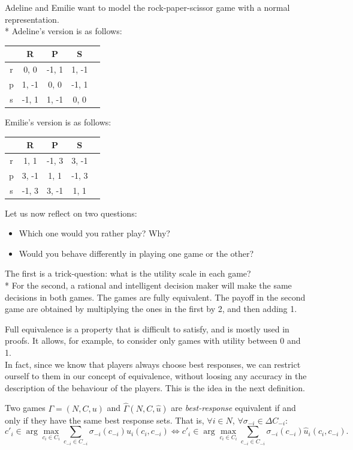 \begin{example}
Adeline and Emilie want to model the rock-paper-scissor game with a normal representation. \\*
Adeline's version is as follows:
\begin{center}
\begin{tabular}{c|cccc}
   & R &  P & S \\ 
\hline r & 0, 0 &  -1, 1 & 1, -1 \\
 p & 1, -1 &  0, 0 & -1, 1 \\
 s & -1, 1 &  1, -1 & 0, 0 \\
\end{tabular} 
\end{center}
Emilie's version is as follows:
\begin{center}
\begin{tabular}{c|cccc}
   & R &  P & S \\ 
\hline r & 1, 1 &  -1, 3 & 3, -1 \\
 p & 3, -1 &  1, 1 & -1, 3 \\
 s & -1, 3 &  3, -1 & 1, 1 \\
\end{tabular} 
\end{center}
Let us now reflect on two questions:
\begin{itemize}
\item Which one would you rather play? Why?
\item Would you behave differently in playing  one game or the other?
\end{itemize}
The first is a trick-question: what is the utility scale in each game?\\*
For the second, a rational and intelligent decision maker will make the same decisions in both games.
 The games are fully equivalent. The payoff in the second game are obtained by multiplying the ones in the first by 2, and then adding 1.
\end{example}

Full equivalence is a property that is difficult to satisfy, and is mostly used in proofs. It allows, for example, to consider only games with utility between 0 and 1.\\
In fact, since we know that players always choose best responses, we can restrict ourself to them in our concept of equivalence, without loosing any accuracy in the description of the behaviour of the players.  This is the idea in the next definition.

\begin{definition}
Two games $\Gamma=(N, C, u)$ and $\hat \Gamma(N,C, \hat u)$  are  \textit{best-response} equivalent if and only if
they have the same best response sets.
That is, 
$\forall i \in N$, $\forall \sigma_{-i} \in \Delta C_{-i}:$\\
$$ c'_i \in \arg \max_{c_i \in C_i} \sum_{c_{-i} \in C_{-i}}
\sigma_{-i}(c_{-i}) u_i(c_i, c_{-i}) \Leftrightarrow c'_i \in \arg \max_{c_i \in C_i} \sum_{c_{-i} \in C_{-i}}
\sigma_{-i}(c_{-i}) \hat{u}_i(c_i, c_{-i}). 
$$
\end{definition}

